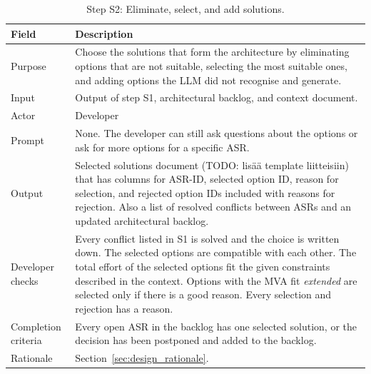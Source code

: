 \begin{table}[!htb]
	\caption{Step S2: Eliminate, select, and add solutions.}
	\label{tab:step_S2}
	\begin{tabularx}{\textwidth}{l X}
		\toprule
		\textbf{Field}      & \textbf{Description}                                                                                                                                                                                                                            \\
		\midrule
		Purpose             & Choose the solutions that form the architecture by eliminating options that are not suitable, selecting the most suitable ones, and adding options the LLM did not recognise and generate. \\
		Input               & Output of step S1, architectural backlog, and context document.                          \\
		Actor               & Developer                                                                                                                                                                                                                                    \\
    Prompt              & None. The developer can still ask questions about the options or ask for more options for a specific ASR.                                                                                                                                                             \\
		Output              & Selected solutions document (TODO: lisää template liitteisiin) that has columns for ASR-ID, selected option ID, reason for selection, and rejected option IDs included with reasons for rejection. Also a list of resolved conflicts between ASRs and an updated architectural backlog.\\
    Developer checks    & Every conflict listed in S1 is solved and the choice is written down. The selected options are compatible with each other. The total effort of the selected options fit the given constraints described in the context. Options with the MVA fit \emph{extended} are selected only if there is a good reason. Every selection and rejection has a reason. \\
		Completion criteria & Every open ASR in the backlog has one selected solution, or the decision has been postponed and added to the backlog. \\
		Rationale           & Section~\ref{sec:design_rationale}.                                                                                     \\
		\bottomrule
	\end{tabularx}
\end{table}


